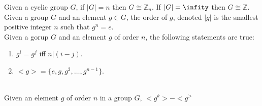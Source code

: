 \documentclass{article}
\newcommand{\Z}{\mathbb{Z}}
\begin{document}
 Given a cyclic group $G$, if $|G| = n$ then $G\cong \Z_n$. If $|G| = \infity$ then $G\cong \Z$.\\

 Given a group $G$ and an element $g\in G$, the order of $g$, denoted $|g|$ is the smallest positive integer $n$ such that $g^n = e$.\\

 Given a gorup $G$ and an element $g$ of order $n$, the following statements are true:
\begin{enumerate}
    \item $g^i = g^j$ iff $n|(i-j).$
    \item $<g> = \{e, g, g^2, \dots, g^{n -1}\}.$
\end{enumerate}\\

 Given an element $g$ of order $n$ in a group $G$, $<g^k> - <g^>$
\end{document}
